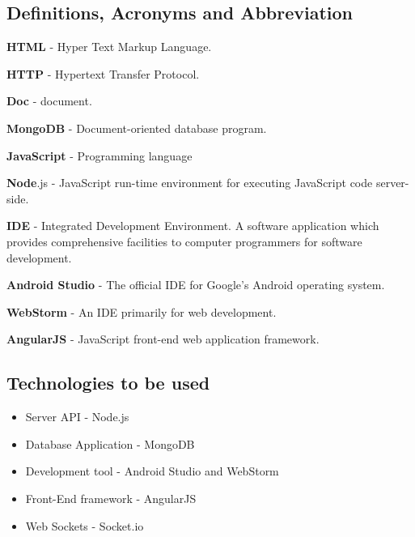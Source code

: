 \documentclass[12pt,a4paper]{article}
\begin{document}
    \subsection{Definitions, Acronyms and
    Abbreviation}\label{section:_Toc146371247}

    \begin{flushleft}

        \textbf{HTML} - Hyper Text Markup Language.

        \textbf{HTTP} - Hypertext Transfer Protocol.

        \textbf{Doc }- document.

        \textbf{MongoDB} - Document-oriented database program.

        \textbf{JavaScript }- Programming language

        \textbf{Node}.js - JavaScript run-time environment for executing
        JavaScript code server-side.

        \textbf{IDE }- Integrated Development Environment. A software
        application which provides comprehensive facilities to computer
        programmers for software development.

        \textbf{Android Studio} - The official IDE for Google's Android
        operating system.

        \textbf{WebStorm} - An IDE primarily for web development.

        \textbf{AngularJS} - JavaScript front-end web application framework.

    \end{flushleft}


    \newpage


    \subsection{Technologies to be used}\label{section:_Toc146371249}


    \begin{itemize}

        \item Server API - Node.js
        \item Database Application - MongoDB
        \item Development tool - Android Studio and WebStorm
        \item Front-End framework - AngularJS
        \item Web Sockets - Socket.io
    \end{itemize}
    \newpage
\end{document}
